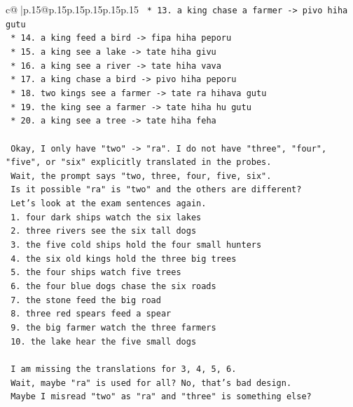 \documentclass{article}
\begin{document}
{\begin{supertabular}{c@{$\;$}|p{.15\linewidth}@{}p{.15\linewidth}p{.15\linewidth}p{.15\linewidth}p{.15\linewidth}p{.15\linewidth}}
{{{\texttt{    *   13. a king chase a farmer {-}> pivo hiha gutu} \\
\texttt{    *   14. a king feed a bird {-}> fipa hiha peporu} \\
\texttt{    *   15. a king see a lake {-}> tate hiha givu} \\
\texttt{    *   16. a king see a river {-}> tate hiha vava} \\
\texttt{    *   17. a king chase a bird {-}> pivo hiha peporu} \\
\texttt{    *   18. two kings see a farmer {-}> tate ra hihava gutu} \\
\texttt{    *   19. the king see a farmer {-}> tate hiha hu gutu} \\
\texttt{    *   20. a king see a tree {-}> tate hiha feha} \\
\\ 
\texttt{    Okay, I only have "two" {-}> "ra". I do not have "three", "four", "five", or "six" explicitly translated in the probes.} \\
\texttt{    Wait, the prompt says "two, three, four, five, six".} \\
\texttt{    Is it possible "ra" is "two" and the others are different?} \\
\texttt{    Let's look at the exam sentences again.} \\
\texttt{    1. four dark ships watch the six lakes} \\
\texttt{    2. three rivers see the six tall dogs} \\
\texttt{    3. the five cold ships hold the four small hunters} \\
\texttt{    4. the six old kings hold the three big trees} \\
\texttt{    5. the four ships watch five trees} \\
\texttt{    6. the four blue dogs chase the six roads} \\
\texttt{    7. the stone feed the big road} \\
\texttt{    8. three red spears feed a spear} \\
\texttt{    9. the big farmer watch the three farmers} \\
\texttt{    10. the lake hear the five small dogs} \\
\\ 
\texttt{    I am missing the translations for 3, 4, 5, 6.} \\
\texttt{    Wait, maybe "ra" is used for all? No, that's bad design.} \\
\texttt{    Maybe I misread "two" as "ra" and "three" is something else?} \\
}}}
\end{supertabular}}
\end{document}
